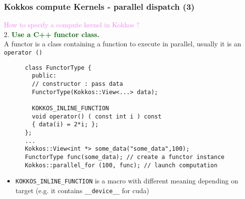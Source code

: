 \begin{frame}[fragile=singleslide]
  \frametitle{Kokkos compute Kernels - parallel dispatch (3)}

  {\large \textcolor{violet}{How to specify a compute kernel in Kokkos ?}}\\
  {\large 2. \textcolor{darkgreen}{\textbf{Use a C++ functor class.}}}\\
  A functor is a class containing a function to execute in parallel, usually it is an \texttt{operator ()}
  {\small
    \begin{verbatim}
      class FunctorType {
        public:
        // constructor : pass data
        FunctorType(Kokkos::View<...> data);

        KOKKOS_INLINE_FUNCTION
        void operator() ( const int i ) const
        { data(i) = 2*i; };
      };
      ...
      Kokkos::View<int *> some_data("some_data",100);
      FunctorType func(some_data); // create a functor instance
      Kokkos::parallel_for (100, func); // launch computation
    \end{verbatim}
    \begin{itemize}
    \item \texttt{KOKKOS\_INLINE\_FUNCTION} is a macro with different meaning depending on target (e.g. it contains \texttt{\_\_device\_\_} for cuda)
    \end{itemize}
  }

\end{frame}

